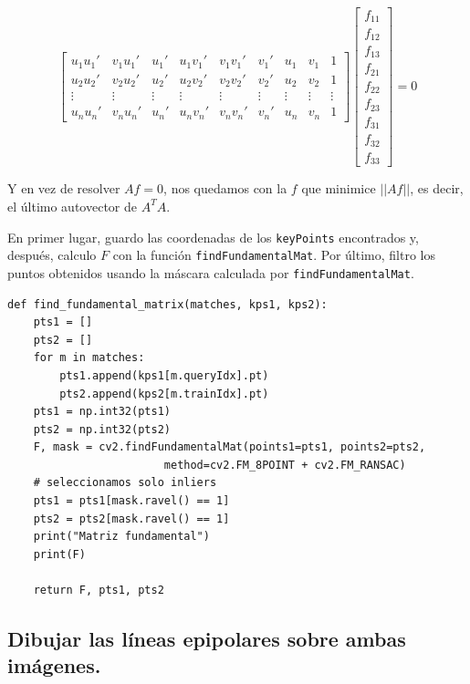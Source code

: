 \documentclass[11pt,a4paper]{article}
\theoremstyle{plain}
\theoremstyle{definition}
\begin{document}
\begin{displaymath}
\left[ 
    \begin{array}{ccccccccc}
    u_1 u_1' & v_1 u_1' & u_1' & u_1 v_1' & v_1 v_1' & v_1' & u_1 & v_1 & 1 \\
    u_2 u_2' & v_2 u_2' & u_2' & u_2 v_2' & v_2 v_2' & v_2' & u_2 & v_2 & 1 \\
    \vdots & \vdots & \vdots & \vdots & \vdots & \vdots & \vdots & \vdots & \vdots \\
    u_n u_n' & v_n u_n' & u_n' & u_n v_n' & v_n v_n' & v_n' & u_n & v_n & 1
    \end{array} \right] \left[ \begin{array}{c}
    f_{11} \\
    f_{12} \\
    f_{13} \\
    f_{21} \\
    f_{22} \\
    f_{23} \\
    f_{31} \\
    f_{32} \\
    f_{33}
    \end{array} \right] = 0
\end{displaymath}

Y en vez de resolver $Af = 0$, nos quedamos con la $f$ que minimice $|| Af ||$, es decir, el último autovector de $A^T A$.

En primer lugar, guardo las coordenadas de los \texttt{keyPoints} encontrados y, después, calculo $F$ con la función \texttt{findFundamentalMat}. Por último, filtro los puntos obtenidos usando la máscara calculada por \texttt{findFundamentalMat}.

\begin{verbatim}
def find_fundamental_matrix(matches, kps1, kps2):
    pts1 = []
    pts2 = []
    for m in matches:
        pts1.append(kps1[m.queryIdx].pt)
        pts2.append(kps2[m.trainIdx].pt)
    pts1 = np.int32(pts1)
    pts2 = np.int32(pts2)
    F, mask = cv2.findFundamentalMat(points1=pts1, points2=pts2, 
                        method=cv2.FM_8POINT + cv2.FM_RANSAC)
    # seleccionamos solo inliers
    pts1 = pts1[mask.ravel() == 1]
    pts2 = pts2[mask.ravel() == 1]
    print("Matriz fundamental")
    print(F)

    return F, pts1, pts2
\end{verbatim}

\subsection{Dibujar las líneas epipolares sobre ambas imágenes.}
\end{document}
